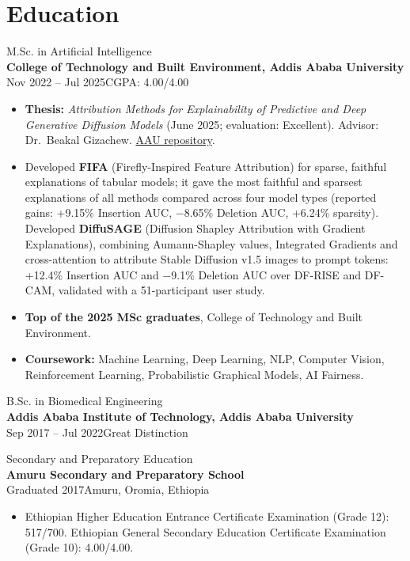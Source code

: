 \documentclass[10pt,a4paper]{article}
\newcommand{\entry}[4]{%
  {\large #1}\\[-1pt]
  {\color{accent}\bfseries #2}\\[-1pt]
  {\small\color{muted}#3\hfill #4}\par\vspace{1pt}}
\begin{document}
\section{Education}
\entry{M.Sc. in Artificial Intelligence}{College of Technology and Built Environment, Addis Ababa University}{Nov 2022 -- Jul 2025}{CGPA: 4.00/4.00}
\begin{itemize}
  \item \textbf{Thesis:} \textit{Attribution Methods for Explainability of Predictive and Deep Generative Diffusion Models} (June 2025; evaluation: Excellent). Advisor: Dr.~Beakal Gizachew. \href{https://etd.aau.edu.et/handle/123456789/7483}{AAU repository}.
  \item Developed \textbf{FIFA} (Firefly-Inspired Feature Attribution) for sparse, faithful explanations of tabular models; it gave the most faithful and sparsest explanations of all methods compared across four model types (reported gains: +9.15\% Insertion AUC, $-$8.65\% Deletion AUC, +6.24\% sparsity). Developed \textbf{DiffuSAGE} (Diffusion Shapley Attribution with Gradient Explanations), combining Aumann-Shapley values, Integrated Gradients and cross-attention to attribute Stable Diffusion v1.5 images to prompt tokens: +12.4\% Insertion AUC and $-$9.1\% Deletion AUC over DF-RISE and DF-CAM, validated with a 51-participant user study.
  \item \textbf{Top of the 2025 MSc graduates}, College of Technology and Built Environment.
  \item \textbf{Coursework:} Machine Learning, Deep Learning, NLP, Computer Vision, Reinforcement Learning, Probabilistic Graphical Models, AI Fairness.
\end{itemize}
\vspace{2pt}
\entry{B.Sc. in Biomedical Engineering}{Addis Ababa Institute of Technology, Addis Ababa University}{Sep 2017 -- Jul 2022}{Great Distinction}

\entry{Secondary and Preparatory Education}{Amuru Secondary and Preparatory School}{Graduated 2017}{Amuru, Oromia, Ethiopia}
\begin{itemize}
  \item Ethiopian Higher Education Entrance Certificate Examination (Grade 12): 517/700. Ethiopian General Secondary Education Certificate Examination (Grade 10): 4.00/4.00.
\end{itemize}
\end{document}
